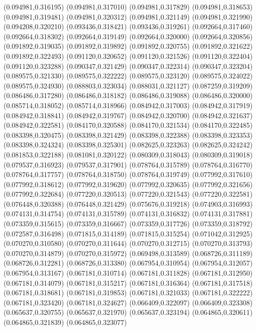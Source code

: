 (0.094981,0.316195)
(0.094981,0.317010)
(0.094981,0.317829)
(0.094981,0.318653)
(0.094981,0.319481)
(0.094981,0.320312)
(0.094981,0.321149)
(0.094981,0.321990)
(0.094208,0.320210)
(0.093436,0.318421)
(0.093436,0.319261)
(0.092664,0.317460)
(0.092664,0.318302)
(0.092664,0.319149)
(0.092664,0.320000)
(0.092664,0.320856)
(0.091892,0.319035)
(0.091892,0.319892)
(0.091892,0.320755)
(0.091892,0.321622)
(0.091892,0.322493)
(0.091120,0.320652)
(0.091120,0.321526)
(0.091120,0.322404)
(0.091120,0.323288)
(0.090347,0.321429)
(0.090347,0.322314)
(0.090347,0.323204)
(0.089575,0.321330)
(0.089575,0.322222)
(0.089575,0.323120)
(0.089575,0.324022)
(0.089575,0.324930)
(0.088803,0.323034)
(0.088031,0.321127)
(0.087259,0.319209)
(0.086486,0.317280)
(0.086486,0.318182)
(0.086486,0.319088)
(0.086486,0.320000)
(0.085714,0.318052)
(0.085714,0.318966)
(0.084942,0.317003)
(0.084942,0.317919)
(0.084942,0.318841)
(0.084942,0.319767)
(0.084942,0.320700)
(0.084942,0.321637)
(0.084942,0.322581)
(0.084170,0.320588)
(0.084170,0.321534)
(0.084170,0.322485)
(0.083398,0.320475)
(0.083398,0.321429)
(0.083398,0.322388)
(0.083398,0.323353)
(0.083398,0.324324)
(0.083398,0.325301)
(0.082625,0.323263)
(0.082625,0.324242)
(0.081853,0.322188)
(0.081081,0.320122)
(0.080309,0.318043)
(0.080309,0.319018)
(0.079537,0.316923)
(0.079537,0.317901)
(0.078764,0.315789)
(0.078764,0.316770)
(0.078764,0.317757)
(0.078764,0.318750)
(0.078764,0.319749)
(0.077992,0.317610)
(0.077992,0.318612)
(0.077992,0.319620)
(0.077992,0.320635)
(0.077992,0.321656)
(0.077992,0.322684)
(0.077220,0.320513)
(0.077220,0.321543)
(0.077220,0.322581)
(0.076448,0.320388)
(0.076448,0.321429)
(0.075676,0.319218)
(0.074903,0.316993)
(0.074131,0.314754)
(0.074131,0.315789)
(0.074131,0.316832)
(0.074131,0.317881)
(0.073359,0.315615)
(0.073359,0.316667)
(0.073359,0.317726)
(0.073359,0.318792)
(0.072587,0.316498)
(0.071815,0.314189)
(0.071815,0.315254)
(0.071042,0.312925)
(0.070270,0.310580)
(0.070270,0.311644)
(0.070270,0.312715)
(0.070270,0.313793)
(0.070270,0.314879)
(0.070270,0.315972)
(0.069498,0.313589)
(0.068726,0.311189)
(0.068726,0.312281)
(0.068726,0.313380)
(0.067954,0.310954)
(0.067954,0.312057)
(0.067954,0.313167)
(0.067181,0.310714)
(0.067181,0.311828)
(0.067181,0.312950)
(0.067181,0.314079)
(0.067181,0.315217)
(0.067181,0.316364)
(0.067181,0.317518)
(0.067181,0.318681)
(0.067181,0.319853)
(0.067181,0.321033)
(0.067181,0.322222)
(0.067181,0.323420)
(0.067181,0.324627)
(0.066409,0.322097)
(0.066409,0.323308)
(0.065637,0.320755)
(0.065637,0.321970)
(0.065637,0.323194)
(0.064865,0.320611)
(0.064865,0.321839)
(0.064865,0.323077)
